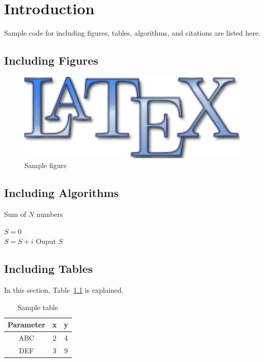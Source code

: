 \chapter{Introduction}\label{ch:introduction}

Sample code for including figures, tables, algorithms, and citations
are listed here.

\section{Including Figures}\label{sec:figures}
\begin{figure}[h]
	\centering
	\includegraphics[scale=0.15]{figures/latexlogo.pdf}
	\caption{Sample figure}
	\label{fig:latexlogo}
\end{figure}


\section{Including Algorithms}\label{sec:algorithms}
\begin{algorithm}[h]
	\caption{Sum of $N$ numbers}
	$S = 0$\\
	{
		$S = S + i$
	}
	Ouput $S$
\end{algorithm}


\section{Including Tables}\label{sec:tables}
In this section, Table~\ref{tab:sample1} is explained.
\begin{table}[h]
	\centering
	\caption{Sample table}
	\begin{tabular}{| c | c | c |}\hline
	\textbf{Parameter} & \textbf{x} & \textbf{y} \\\hline\hline
	ABC & 2 & 4 \\\hline
	DEF & 3 & 9 \\\hline	
	\end{tabular}
	\label{tab:sample1}
\end{table}

